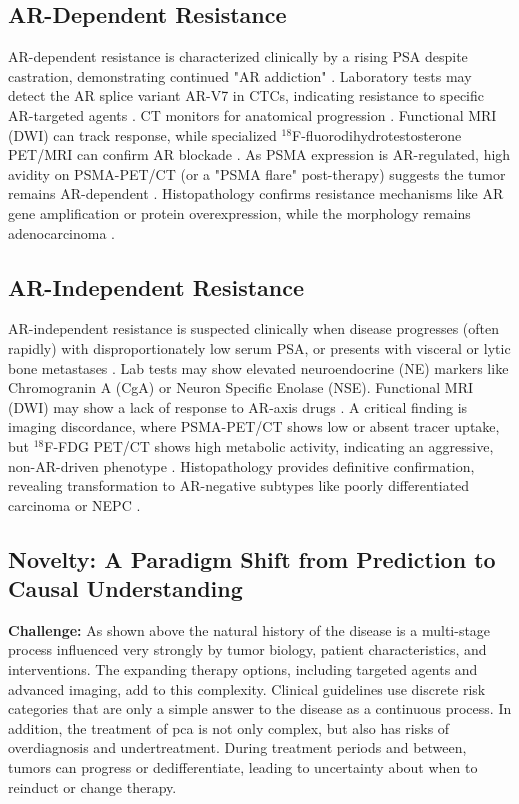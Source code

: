 \documentclass[11pt, a4paper]{article}
\begin{document}
\subsection{AR-Dependent Resistance}
AR-dependent resistance is characterized clinically by a rising PSA despite castration, demonstrating continued "AR addiction" \cite{LeePark2020}. Laboratory tests may detect the AR splice variant AR-V7 in CTCs, indicating resistance to specific AR-targeted agents \cite{ChenWang2023}. CT monitors for anatomical progression \cite{AmalachandranSivathapandi2024}. Functional MRI (DWI) can track response, while specialized ${}^{18}$F-fluorodihydrotestosterone PET/MRI can confirm AR blockade \cite{BrissetHoff2015}. As PSMA expression is AR-regulated, high avidity on PSMA-PET/CT (or a "PSMA flare" post-therapy) suggests the tumor remains AR-dependent \cite{MohseniniaZamaniSiahkali2024,KleiburgGeusOei2025}. Histopathology confirms resistance mechanisms like AR gene amplification or protein overexpression, while the morphology remains adenocarcinoma \cite{MartinCaraballo2024}.

\subsection{AR-Independent Resistance}
AR-independent resistance is suspected clinically when disease progresses (often rapidly) with disproportionately low serum PSA, or presents with visceral or lytic bone metastases \cite{OKAHATANO2024}. Lab tests may show elevated neuroendocrine (NE) markers like Chromogranin A (CgA) or Neuron Specific Enolase (NSE). Functional MRI (DWI) may show a lack of response to AR-axis drugs \cite{BrissetHoff2015}. A critical finding is imaging discordance, where PSMA-PET/CT shows low or absent tracer uptake, but ${}^{18}$F-FDG PET/CT shows high metabolic activity, indicating an aggressive, non-AR-driven phenotype \cite{AmalachandranSivathapandi2024,MohseniniaZamaniSiahkali2024}. Histopathology provides definitive confirmation, revealing transformation to AR-negative subtypes like poorly differentiated carcinoma or NEPC .



\subsection{Novelty: A Paradigm Shift from Prediction to Causal Understanding}
\textbf{Challenge:} 
As shown above the natural history of the disease is a multi-stage process influenced very strongly by tumor biology, patient characteristics, and interventions. The expanding therapy options, including targeted agents and advanced imaging, add to this complexity. Clinical guidelines use discrete risk categories that are only a simple answer to the disease as a continuous process. In addition, the treatment of \gls{pca} is not only complex, but also has risks of overdiagnosis and undertreatment. During treatment periods and between, tumors can progress or dedifferentiate, leading to uncertainty about when to reinduct or change therapy. 
\end{document}
